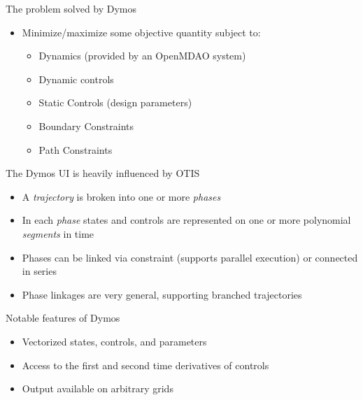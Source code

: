\documentclass[aspectratio=169, usenames,dvipsnames, 14pt]{beamer}
\begin{document}
\begin{frame}{The problem solved by Dymos}
    \begin{itemize}
	  	\item Minimize/maximize some objective quantity subject to:
		\vspace{0.25cm}
		    \begin{itemize}
		      \item Dynamics (provided by an OpenMDAO system)
    		  \vspace{0.25cm}
		      \item Dynamic controls
    		  \vspace{0.25cm}
		      \item Static Controls (design parameters)
    		  \vspace{0.25cm}
		      \item Boundary Constraints
    		  \vspace{0.25cm}
		      \item Path Constraints
		    \end{itemize}
    \end{itemize}    
\end{frame}


\begin{frame}{The Dymos UI is heavily influenced by OTIS}
    \begin{itemize}
	  \item A \emph{trajectory} is broken into one or more \emph{phases}
	  \item In each \emph{phase} states and controls are represented on one or more polynomial \emph{segments} in time
	  \item Phases can be linked via constraint (supports parallel execution) or connected in series
	  \item Phase linkages are very general, supporting branched trajectories
	\end{itemize}
\end{frame}


\begin{frame}{Notable features of Dymos}
    \begin{itemize}
	  \item Vectorized states, controls, and parameters
	  \vspace{0.25cm}
	  \item Access to the first and second time derivatives of controls
	  \item Output available on arbitrary grids
	\end{itemize}
\end{frame}
\end{document}
